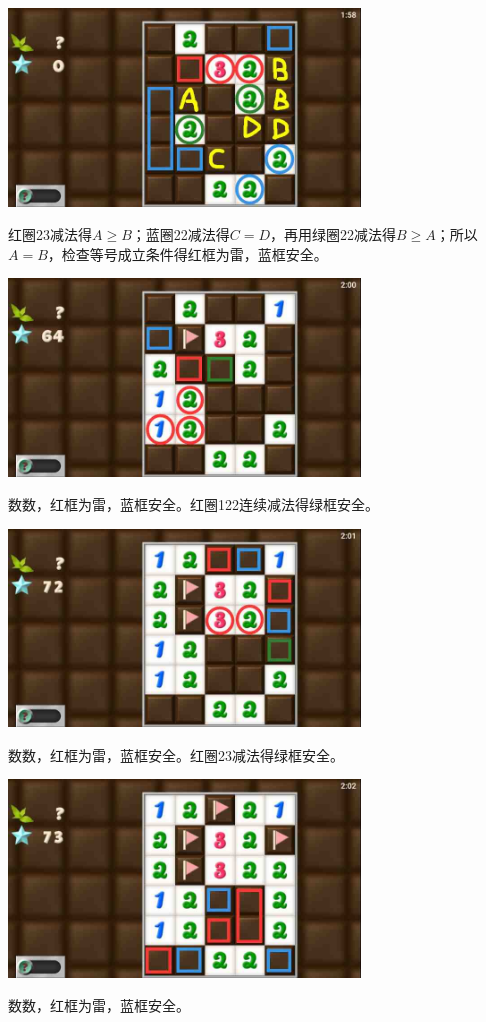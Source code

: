 \subsection{} %
\begin{center}
    \includegraphics[width=0.7\textwidth]{puzzlelow/228-1.jpg}
\end{center}
红圈23减法得$A\ge B$；蓝圈22减法得$C=D$，再用绿圈22减法得$B\ge A$；所以$A=B$，检查等号成立条件得红框为雷，蓝框安全。
\begin{center}
    \includegraphics[width=0.7\textwidth]{puzzlelow/228-2.jpg}
\end{center}
数数，红框为雷，蓝框安全。红圈122连续减法得绿框安全。
\begin{center}
    \includegraphics[width=0.7\textwidth]{puzzlelow/228-3.jpg}
\end{center}
数数，红框为雷，蓝框安全。红圈23减法得绿框安全。
\begin{center}
    \includegraphics[width=0.7\textwidth]{puzzlelow/228-4.jpg}
\end{center}
数数，红框为雷，蓝框安全。

